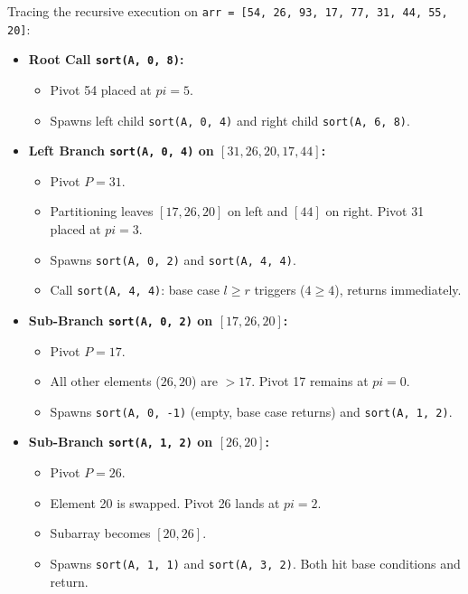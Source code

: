 \documentclass[10pt,journal,compsoc,onecolumn]{IEEEtran}
\begin{document}
Tracing the recursive execution on \texttt{arr = [54, 26, 93, 17, 77, 31, 44, 55, 20]}:

\begin{itemize}
    \item \textbf{Root Call \texttt{sort(A, 0, 8)}:}
    \begin{itemize}
        \item Pivot 54 placed at $pi = 5$.
        \item Spawns left child \texttt{sort(A, 0, 4)} and right child \texttt{sort(A, 6, 8)}.
    \end{itemize}

    \item \textbf{Left Branch \texttt{sort(A, 0, 4)} on $[31, 26, 20, 17, 44]$:}
    \begin{itemize}
        \item Pivot $P = 31$.
        \item Partitioning leaves $[17, 26, 20]$ on left and $[44]$ on right. Pivot 31 placed at $pi = 3$.
        \item Spawns \texttt{sort(A, 0, 2)} and \texttt{sort(A, 4, 4)}.
        \item Call \texttt{sort(A, 4, 4)}: base case $l \ge r$ triggers ($4 \ge 4$), returns immediately.
    \end{itemize}

    \item \textbf{Sub-Branch \texttt{sort(A, 0, 2)} on $[17, 26, 20]$:}
    \begin{itemize}
        \item Pivot $P = 17$.
        \item All other elements ($26, 20$) are $> 17$. Pivot 17 remains at $pi = 0$.
        \item Spawns \texttt{sort(A, 0, -1)} (empty, base case returns) and \texttt{sort(A, 1, 2)}.
    \end{itemize}

    \item \textbf{Sub-Branch \texttt{sort(A, 1, 2)} on $[26, 20]$:}
    \begin{itemize}
        \item Pivot $P = 26$.
        \item Element 20 is swapped. Pivot 26 lands at $pi = 2$.
        \item Subarray becomes $[20, 26]$.
        \item Spawns \texttt{sort(A, 1, 1)} and \texttt{sort(A, 3, 2)}. Both hit base conditions and return.
    \end{itemize}


\end{itemize}
\end{document}
